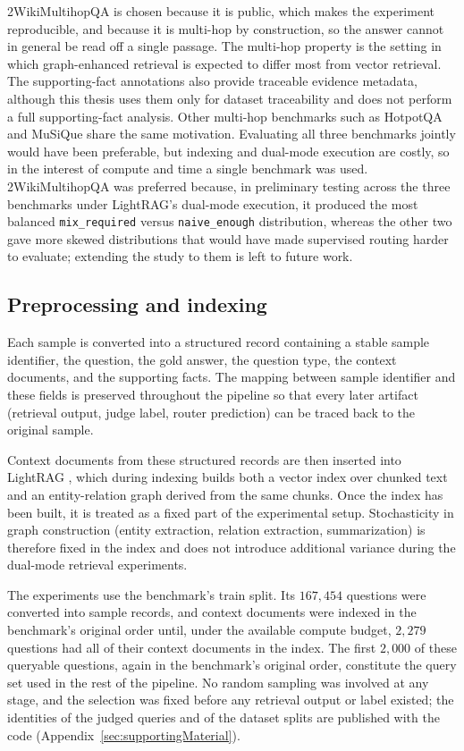 \documentclass[english, bibtex]{kththesis}               %
\numberwithin{listing}{chapter}
\begin{document}
2WikiMultihopQA is chosen because it is public, which makes the experiment reproducible, and because it is multi-hop by construction, so the answer cannot in general be read off a single passage. The multi-hop property is the setting in which graph-enhanced retrieval is expected to differ most from vector retrieval. The supporting-fact annotations also provide traceable evidence metadata, although this thesis uses them only for dataset traceability and does not perform a full supporting-fact analysis. Other multi-hop benchmarks such as HotpotQA and MuSiQue \cite{yang2018hotpotqa,trivedi2022musique} share the same motivation. Evaluating all three benchmarks jointly would have been preferable, but indexing and dual-mode execution are costly, so in the interest of compute and time a single benchmark was used. 2WikiMultihopQA was preferred because, in preliminary testing across the three benchmarks under LightRAG's dual-mode execution, it produced the most balanced \texttt{mix\_required} versus \texttt{naive\_enough} distribution, whereas the other two gave more skewed distributions that would have made supervised routing harder to evaluate; extending the study to them is left to future work.

\subsection{Preprocessing and indexing}
\label{sec:methodPreprocessing}

Each sample is converted into a structured record containing a stable sample identifier, the question, the gold answer, the question type, the context documents, and the supporting facts. The mapping between sample identifier and these fields is preserved throughout the pipeline so that every later artifact (retrieval output, judge label, router prediction) can be traced back to the original sample.

Context documents from these structured records are then inserted into LightRAG \cite{lightrag2024}, which during indexing builds both a vector index over chunked text and an entity-relation graph derived from the same chunks. Once the index has been built, it is treated as a fixed part of the experimental setup. Stochasticity in graph construction (entity extraction, relation extraction, summarization) is therefore fixed in the index and does not introduce additional variance during the dual-mode retrieval experiments.

The experiments use the benchmark's train split. Its $167{,}454$ questions were converted into sample records, and context documents were indexed in the benchmark's original order until, under the available compute budget, $2{,}279$ questions had all of their context documents in the index. The first $2{,}000$ of these queryable questions, again in the benchmark's original order, constitute the query set used in the rest of the pipeline. No random sampling was involved at any stage, and the selection was fixed before any retrieval output or label existed; the identities of the judged queries and of the dataset splits are published with the code (Appendix~\ref{sec:supportingMaterial}).
\end{document}
